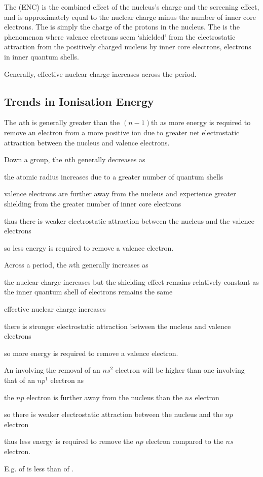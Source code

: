 \documentclass[Chemistry.tex]{subfiles}
\begin{document}
The  (ENC) is the combined effect of the nucleus's charge and the screening effect, and is approximately equal to the nuclear charge minus the number of inner core electrons. The  is simply the charge of the protons in the nucleus. The  is the phenomenon where valence electrons seem `shielded' from the electrostatic attraction from the positively charged nucleus by inner core electrons, \slIE{} electrons in inner quantum shells.

Generally, effective nuclear charge increases across the period.
\subsection{Trends in Ionisation Energy}
The \(n\)th \slIE{} is generally greater than the \((n-1)\)th \slIE{} as more energy is required to remove an electron from a more positive ion due to greater net electrostatic attraction between the nucleus and valence electrons.

Down a group, the \(n\)th \slIE{} generally decreases as \begin{slinenum}
\item the atomic radius increases due to a greater number of quantum shells
\item valence electrons are further away from the nucleus and experience greater shielding from the greater number of inner core electrons
\item thus there is weaker electrostatic attraction between the nucleus and the valence electrons
\item so less energy is required to remove a valence electron.\end{slinenum}

Across a period, the \(n\)th \slIE{} generally increases as \begin{slinenum}
\item the nuclear charge increases but the shielding effect remains relatively constant as the inner quantum shell of electrons remains the same
\item effective nuclear charge increases
\item there is stronger electrostatic attraction between the nucleus and valence electrons
\item so more energy is required to remove a valence electron.\end{slinenum}

An \slIE{} involving the removal of an \(ns^2\) electron will be higher than one involving that of an \(np^1\) electron as \begin{slinenum}
\item the \(np\) electron is further away from the nucleus than the \(ns\) electron
\item so there is weaker electrostatic attraction between the nucleus and the \(np\) electron
\item thus less energy is required to remove the \(np\) electron compared to the \(ns\) electron.\end{slinenum} E.g.  of  is less than  of .
\end{document}
